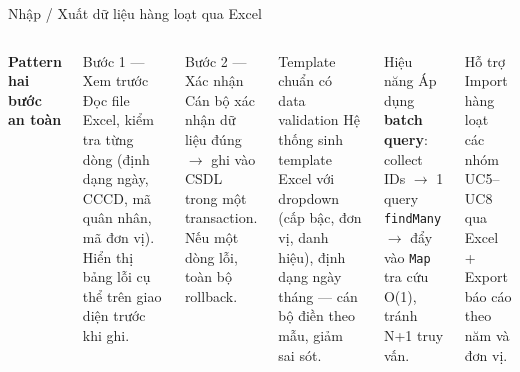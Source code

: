 \documentclass[aspectratio=43,xcolor=table]{beamer}
\begin{document}
\begin{frame}{Nhập / Xuất dữ liệu hàng loạt qua Excel}
  \begin{columns}[T,onlytextwidth]
    \textbf{Pattern hai bước an toàn}\\[0.2cm]
    \begin{block}{Bước 1 --- Xem trước}
      \scriptsize Đọc file Excel, kiểm tra từng dòng (định dạng ngày, CCCD, mã quân nhân, mã đơn vị). Hiển thị bảng lỗi cụ thể trên giao diện trước khi ghi.
    \end{block}

    \begin{block}{Bước 2 --- Xác nhận}
      \scriptsize Cán bộ xác nhận dữ liệu đúng $\to$ ghi vào CSDL trong một transaction. Nếu một dòng lỗi, toàn bộ rollback.
    \end{block}

    \begin{block}{Template chuẩn có data validation}
      \scriptsize Hệ thống sinh template Excel với dropdown (cấp bậc, đơn vị, danh hiệu), định dạng ngày tháng --- cán bộ điền theo mẫu, giảm sai sót.
    \end{block}

    \begin{block}{Hiệu năng}
      \scriptsize Áp dụng \textbf{batch query}: collect IDs $\to$ 1 query \texttt{findMany} $\to$ đẩy vào \texttt{Map} tra cứu O(1), tránh N+1 truy vấn.
    \end{block}

    \begin{block}{Hỗ trợ}
      \scriptsize Import hàng loạt các nhóm UC5--UC8 qua Excel + Export báo cáo theo năm và đơn vị.
    \end{block}
  \end{columns}
\end{frame}
\end{document}
